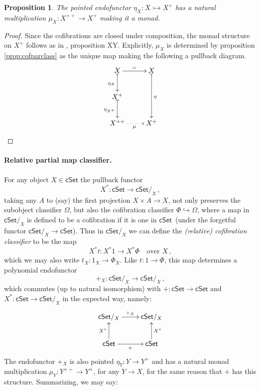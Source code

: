 \documentclass[11pt]{amsart}
\newcommand{\cSet}{\ensuremath{\mathsf{cSet}}}
\newcommand{\hook}{\ensuremath{\hookrightarrow}}
\newcommand{\mono}{\ensuremath{\rightarrowtail}}
\newcommand{\ra}{\ensuremath{\rightarrow}}
\renewcommand{\to}{\ensuremath{\rightarrow}}
\newcommand{\too}{\ensuremath{\longrightarrow}}
\newtheorem{proposition}[theorem]{Proposition}
\theoremstyle{remark}
\theoremstyle{definition}
\begin{document}

\begin{proposition}\label{prop:plusmonad}
The pointed endofunctor  $\eta_X : X\mono X^+$ has a natural multiplication $\mu_X : X^{++} \ra X^+$ making it a monad.
\end{proposition}

\begin{proof}
Since the cofibrations are closed under composition, the monad structure on $X^+$ follows as in \cite{AN}, proposition XY.  Explicitly, $\mu_X$ is determined by proposition \ref{prop:cofparclass} as the unique map making the following a pullback diagram.
\[
\xymatrix{
X \ar@{>->}[d]_{\eta_X} \ar[r]^= & X \ar@{>->}[dd]^{\eta}\\
X^+ \ar@{>->}[d]_{\eta_{X^+}} & \\
X^{++} \ar@{.>}[r]_\mu & X^+
}
\]
\end{proof}

\paragraph{Relative partial map classifier.}

For any object $X\in\cSet$ the pullback functor $$X^* : \cSet \ra \cSet/_X\,,$$ taking any $A$ to (say) the first projection $X\times A \ra X$, not only preserves the subobject classifier $\Omega$, but also the cofibration classifier $\Phi \hook \Omega$, where a map in $\cSet/_X$ is defined to be a cofibration if it is one in \cSet\ (under the forgetful functor $\cSet/_X \to \cSet$). Thus in $\cSet/_X$ we can define the \emph{(relative) cofibration classifier} to be the map
\[
X^*t : X^*1 \too X^*\Phi	\quad\text{over $X$}\,,
\]
which we may also write $t_X : 1_X \ra \Phi_X$.  Like $t : 1\ra \Phi$, this map determines a polynomial endofunctor  $$+_X : \cSet/_X \ra \cSet/_X\,,$$ which commutes (up to natural isomorphism) with $+ : \cSet \ra \cSet$ and $X^* : \cSet \ra \cSet/_X$ in the expected way, namely:
\begin{equation}\label{diag:+fibered}
\xymatrix{
\cSet/_X \ar[r]^{+_X}& \cSet/_X \\
\cSet \ar[u]^{X^*} \ar[r]_+ & \ar[u]_{X^*}\cSet 
}
\end{equation}
The endofunctor $+_X$ is also pointed $\eta_Y : Y \ra Y^+$ and has a natural monad multiplication $\mu_Y : Y^{++} \ra Y^+$, for any $Y\ra X$, for the same reason that $+$ has this structure.  Summarizing, we may say:
\end{document}
